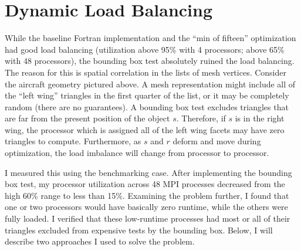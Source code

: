 \documentclass[11pt,letterpaper]{article}
\begin{document}
\section{Dynamic Load Balancing}
\qquad While the baseline Fortran implementation and the ``min of fifteen'' optimization had good load balancing (utilization above 95\% with 4 processors; above 65\% with 48 processors), the bounding box test absolutely ruined the load balancing.
The reason for this is spatial correlation in the lists of mesh vertices.
Consider the aircraft geometry pictured above.
A mesh representation might include all of the ``left wing'' triangles in the first quarter of the list, or it may be completely random (there are no guarantees).
A bounding box test excludes triangles that are far from the present position of the object $s$.
Therefore, if $s$ is in the right wing, the processor which is assigned all of the left wing facets may have zero triangles to compute.
Furthermore, as $s$ and $r$ deform and move during optimization, the load imbalance will change from processor to processor.

\qquad I measured this using the benchmarking case.
After implementing the bounding box test, my processor utilization across 48 MPI processes decreased from the high 60\% range to less than 15\%.
Examining the problem further, I found that one or two processors would have basically zero runtime, while the others were fully loaded.
I verified that these low-runtime processes had most or all of their triangles excluded from expensive tests by the bounding box.
Below, I will describe two approaches I used to solve the problem.
\end{document}
